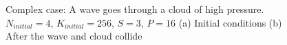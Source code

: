 \begin{figure}[H]
    \centering
    \hfill
    \caption{Complex case: A wave goes through a cloud of high pressure. \(N_{initial} = 4\), \(K_{initial} = 256\), \(S = 3\), \(P = 16\) (a) Initial conditions (b) After the wave and cloud collide}\label{fig:cloud_p}
\end{figure}

